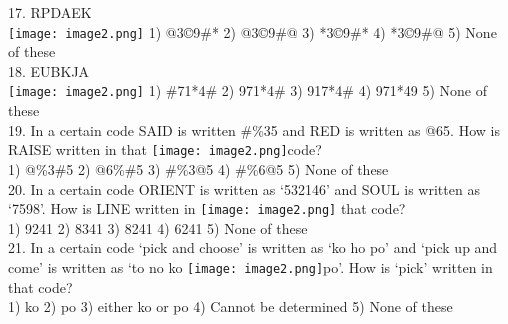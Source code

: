 \documentclass[
]{article}
\begin{document}
17. RPDAEK\\
\texttt{[image: image2.png]}
1) @3©9\#* \hspace{2mm}2) @3©9\#@ \hspace{2mm}3) *3©9\#* \hspace{2mm}4) *3©9\#@ \hspace{2mm}5) None of these\\

18. EUBKJA\\
\texttt{[image: image2.png]}
1) \#71*4\# \hspace{2mm}2) 971*4\# \hspace{2mm}3) 917*4\# \hspace{2mm}4) 971*49 \hspace{2mm}5) None of these\\

19. In a certain code SAID is written \#\%35 and RED is written as @65. How is RAISE written in that \texttt{[image: image2.png]}code?\\
1) @\%3\#5 \hspace{2mm}2) @6\%\#5 \hspace{2mm}3) \#\%3@5 \hspace{2mm}4) \#\%6@5 \hspace{2mm}5) None of these\\

20. In a certain code ORIENT is written as ‘532146’ and SOUL is written as ‘7598’. How is LINE
written in \texttt{[image: image2.png]} that code?\\
1) 9241 \hspace{2mm}2) 8341 \hspace{2mm}3) 8241 \hspace{2mm}4) 6241 \hspace{2mm}5) None of these\\


21. In a certain code ‘pick and choose’ is written as ‘ko ho po’ and ‘pick up and come’ is written
as ‘to no ko \texttt{[image: image2.png]}po’. How is ‘pick’ written in that code?\\
1) ko \hspace{2mm}2) po \hspace{2mm}3) either ko or po \hspace{2mm}4) Cannot be determined \hspace{2mm}5) None of these\\
\end{document}

